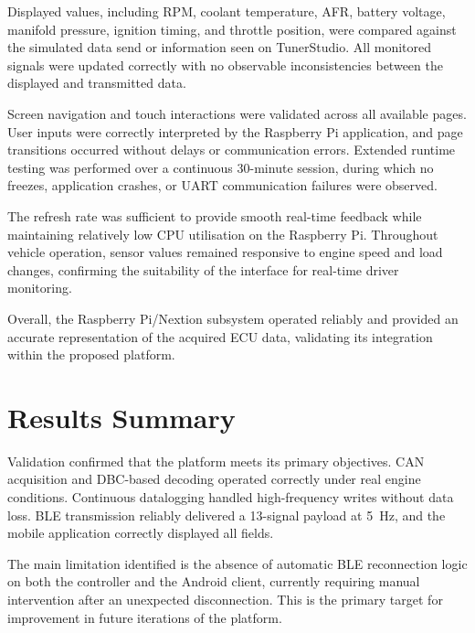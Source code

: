 Displayed values, including RPM, coolant temperature, AFR, battery voltage,
manifold pressure, ignition timing, and throttle position, were compared
against the simulated data send or information seen on TunerStudio. All monitored 
signals were updated correctly with no observable inconsistencies between the 
displayed and transmitted data.

Screen navigation and touch interactions were validated across all available
pages. User inputs were correctly interpreted by the Raspberry Pi application,
and page transitions occurred without delays or communication errors. Extended
runtime testing was performed over a continuous 30-minute session, during which
no freezes, application crashes, or UART communication failures were observed.

The refresh rate was sufficient to provide smooth real-time feedback while
maintaining relatively low CPU utilisation on the Raspberry Pi. Throughout vehicle
operation, sensor values remained responsive to engine speed and load changes,
confirming the suitability of the interface for real-time driver monitoring.

Overall, the Raspberry Pi/Nextion subsystem operated reliably and provided an
accurate representation of the acquired ECU data, validating its integration
within the proposed platform.

\section{Results Summary}

Validation confirmed that the platform meets its primary objectives. 
CAN acquisition and DBC-based decoding operated correctly under real 
engine conditions. Continuous datalogging handled
high-frequency writes without data loss. BLE transmission reliably delivered
a 13-signal payload at 5~Hz, and the mobile application correctly displayed
all fields.

The main limitation identified is the absence of automatic BLE reconnection
logic on both the controller and the Android client, currently requiring
manual intervention after an unexpected disconnection. This is the primary
target for improvement in future iterations of the platform.


